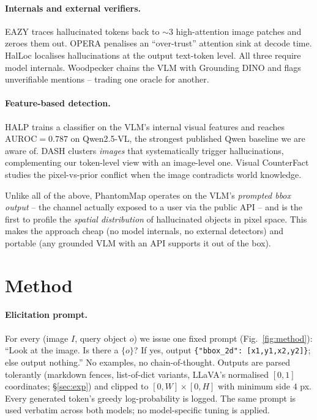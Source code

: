 \documentclass[10pt,twocolumn,letterpaper]{article}
\begin{document}
\paragraph{Internals and external verifiers.} EAZY \cite{eazy} traces
hallucinated tokens back to $\sim 3$ high-attention image patches and
zeroes them out. OPERA \cite{opera} penalises an ``over-trust''
attention sink at decode time. HalLoc \cite{halloc} localises
hallucinations at the output text-token level. All three require
model internals. Woodpecker \cite{woodpecker} chains the VLM with
Grounding DINO and flags unverifiable mentions -- trading one oracle
for another.

\paragraph{Feature-based detection.} HALP \cite{halp} trains a
classifier on the VLM's internal visual features and reaches
$\mathrm{AUROC}=0.787$ on Qwen2.5-VL, the strongest published Qwen
baseline we are aware of. DASH \cite{dash} clusters \emph{images}
that systematically trigger hallucinations, complementing our
token-level view with an image-level one. Visual CounterFact
\cite{pixelsvspriors} studies the pixel-vs-prior conflict when the
image contradicts world knowledge.

Unlike all of the above, PhantomMap operates on the VLM's
\emph{prompted bbox output} -- the channel actually exposed to a
user via the public API -- and is the first to profile the
\emph{spatial distribution} of hallucinated objects in pixel space.
This makes the approach cheap (no model internals, no external
detectors) and portable (any grounded VLM with an API supports it
out of the box).

\section{Method}

\paragraph{Elicitation prompt.} For every (image $I$, query object
$o$) we issue one fixed prompt (Fig.~\ref{fig:method}):
``Look at the image. Is there a $\{o\}$? If yes, output
\texttt{\{"bbox\_2d": [x1,y1,x2,y2]\}}; else output nothing.'' No
examples, no chain-of-thought. Outputs are parsed tolerantly
(markdown fences, list-of-dict variants, LLaVA's normalised $[0,1]$
coordinates; \S\ref{sec:exp}) and clipped to $[0,W]\times[0,H]$ with
minimum side $4$ px. Every generated token's greedy log-probability is
logged. The same prompt is used verbatim across both models; no
model-specific tuning is applied.
\end{document}
